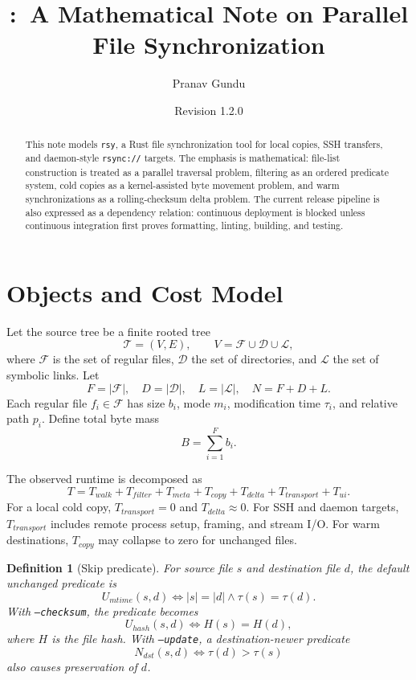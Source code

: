 \documentclass[11pt]{article}
\title{\vspace{-2em}\rsy:\ A Mathematical Note on Parallel File Synchronization}
\author{Pranav Gundu}
\date{Revision 1.2.0}
\newtheorem{definition}{Definition}
\newcommand{\rsy}{\texttt{rsy}}
\newcommand{\files}{\mathcal{F}}
\newcommand{\dirs}{\mathcal{D}}
\newcommand{\links}{\mathcal{L}}
\begin{document}
\maketitle

\begin{abstract}
\noindent
This note models \rsy, a Rust file synchronization tool for local copies, SSH transfers, and daemon-style \texttt{rsync://} targets. The emphasis is mathematical: file-list construction is treated as a parallel traversal problem, filtering as an ordered predicate system, cold copies as a kernel-assisted byte movement problem, and warm synchronizations as a rolling-checksum delta problem. The current release pipeline is also expressed as a dependency relation: continuous deployment is blocked unless continuous integration first proves formatting, linting, building, and testing.
\end{abstract}

\section{Objects and Cost Model}

Let the source tree be a finite rooted tree
\[
  \mathcal{T} = (V,E), \qquad V = \files \cup \dirs \cup \links,
\]
where $\files$ is the set of regular files, $\dirs$ the set of directories, and $\links$ the set of symbolic links. Let
\[
  F = |\files|, \quad D = |\dirs|, \quad L = |\links|, \quad N = F + D + L.
\]
Each regular file $f_i \in \files$ has size $b_i$, mode $m_i$, modification time $\tau_i$, and relative path $p_i$. Define total byte mass
\[
  B = \sum_{i=1}^{F} b_i.
\]

The observed runtime is decomposed as
\begin{equation}
  T = T_{walk} + T_{filter} + T_{meta} + T_{copy} + T_{delta} + T_{transport} + T_{ui}.
\end{equation}
For a local cold copy, $T_{transport}=0$ and $T_{delta}\approx0$. For SSH and daemon targets, $T_{transport}$ includes remote process setup, framing, and stream I/O. For warm destinations, $T_{copy}$ may collapse to zero for unchanged files.

\begin{definition}[Skip predicate]
For source file $s$ and destination file $d$, the default unchanged predicate is
\begin{equation}
  U_{mtime}(s,d) \iff |s|=|d| \land \tau(s)=\tau(d).
\end{equation}
With \texttt{--checksum}, the predicate becomes
\begin{equation}
  U_{hash}(s,d) \iff H(s)=H(d),
\end{equation}
where $H$ is the file hash. With \texttt{--update}, a destination-newer predicate
\begin{equation}
  N_{dst}(s,d) \iff \tau(d)>\tau(s)
\end{equation}
also causes preservation of $d$.
\end{definition}
\end{document}
